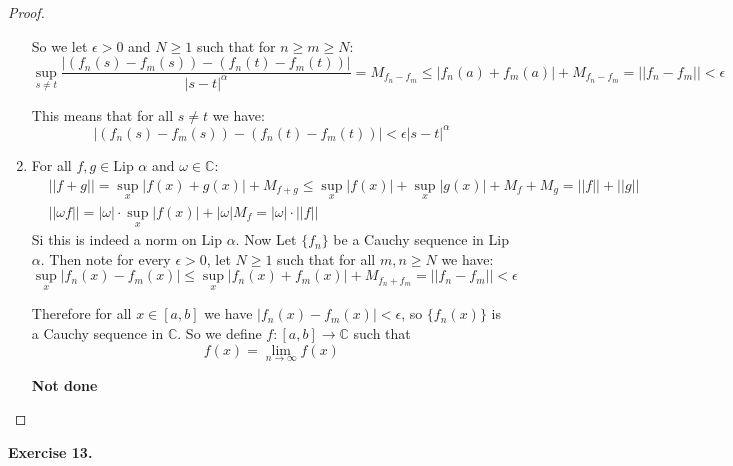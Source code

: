 \documentclass{article}
\newcommand{\C}{\mathbb{C}}
\theoremstyle{definition}
\theoremstyle{remark}
\theoremstyle{definition}
\begin{document}
\begin{proof}
\begin{enumerate}[label = (\alph*)]
        So we let $\epsilon>0$ and $N\geq 1$ such that for $n\geq m\geq N$: \begin{equation*}
            \sup_{s\neq t}\frac{|(f_n(s)-f_m(s))-(f_n(t)-f_m(t))|}{|s-t|^\alpha} = M_{f_n-f_m} \leq |f_n(a)+f_m(a)| + M_{f_n-f_m} = ||f_n-f_m|| <\epsilon
        \end{equation*}

        This means that for all $s\neq t$ we have: \begin{equation*}
            |(f_n(s)-f_m(s))-(f_n(t)-f_m(t))|<\epsilon|s-t|^\alpha
        \end{equation*}
        \item For all $f,g\in \text{Lip }\alpha$ and $\omega\in \C$:\begin{align*}
            &||f+g|| = \sup_x|f(x)+g(x)| + M_{f+g}\leq \sup_x|f(x)| + \sup_x|g(x)| + M_f+M_g = ||f||+||g||\\
            &||\omega f|| = |\omega|\cdot\sup_x|f(x)|+|\omega| M_f = |\omega|\cdot ||f||
        \end{align*}
        Si this is indeed a norm on Lip $\alpha$. Now Let $\{f_n\}$ be a Cauchy sequence in Lip $\alpha$.
Then note for every $\epsilon>0$, let $N\geq 1$ such that for all $m,n\geq N$ we have:\begin{equation}
    \sup_x |f_n(x)-f_m(x)|\leq \sup_x|f_n(x)+f_m(x)| + M_{f_n+f_m} = ||f_n-f_m||<\epsilon
\end{equation}

Therefore for all $x\in [a,b]$ we have $|f_n(x)-f_m(x)|<\epsilon$, so $\{f_n(x)\}$ is a Cauchy sequence in $\C$.
So we define $f\colon [a,b]\rightarrow \C$ such that \begin{equation}f(x) = \lim_{n\rightarrow \infty}f(x)\end{equation}
    
\textbf{Not done}

\end{enumerate}
\end{proof}
\textbf{Exercise 13.}
\end{document}
